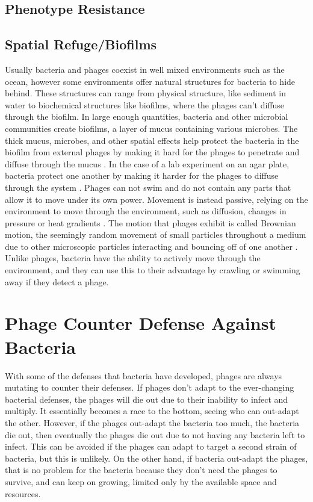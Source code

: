 \subsection{Phenotype Resistance}

\subsection{Spatial Refuge/Biofilms} 
Usually bacteria and phages coexist in well mixed environments such as the ocean, however some environments offer natural structures for bacteria to hide behind. 
These structures can range from physical structure, like sediment in water to biochemical structures like biofilms, where the phages can't diffuse through the biofilm. 
In large enough quantities, bacteria and other microbial communities create biofilms, a layer of mucus containing various microbes. 
The thick mucus, microbes, and other spatial effects help protect the bacteria in the biofilm from external phages by making it hard for the phages to penetrate and diffuse through the mucus \cite{abedonPhageDelayEnhancing2017}. 
In the case of a lab experiment on an agar plate, bacteria protect one another by making it harder for the phages to diffuse through the system \cite{eriksenGrowingMicrocolonyCan2018}. \newline
Phages can not swim and do not contain any parts that allow it to move under its own power. 
Movement is instead passive, relying on the environment to move through the environment, such as diffusion, changes in pressure or heat gradients \cite{lohrmannInfluenceBacterialSwimming2024}. 
The motion that phages exhibit is called Brownian motion, the seemingly random movement of small particles throughout a medium due to other microscopic particles interacting and bouncing off of one another \cite{moineauBacteriophage2013}. 
Unlike phages, bacteria have the ability to actively move through the environment, and they can use this to their advantage by crawling or swimming away if they detect a phage. 


\section{Phage Counter Defense Against Bacteria}
With some of the defenses that bacteria have developed, phages are always mutating to counter their defenses. 
If phages don't adapt to the ever-changing bacterial defenses, the phages will die out due to their inability to infect and multiply. 
It essentially becomes a race to the bottom, seeing who can out-adapt the other. 
However, if the phages out-adapt the bacteria too much, the bacteria die out, then eventually the phages die out due to not having any bacteria left to infect. \newline
This can be avoided if the phages can adapt to target a second strain of bacteria, but this is unlikely. 
On the other hand, if bacteria out-adapt the phages, that is no problem for the bacteria because they don't need the phages to survive, and can keep on growing, limited only by the available space and resources. 

